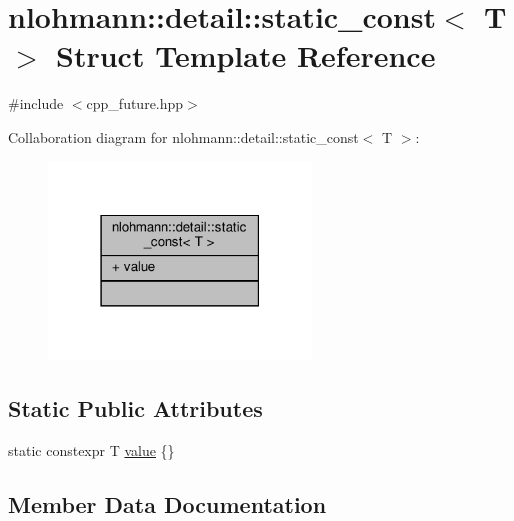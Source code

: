 \hypertarget{structnlohmann_1_1detail_1_1static__const}{}\section{nlohmann\+:\+:detail\+:\+:static\+\_\+const$<$ T $>$ Struct Template Reference}
\label{structnlohmann_1_1detail_1_1static__const}


{\ttfamily \#include $<$cpp\+\_\+future.\+hpp$>$}



Collaboration diagram for nlohmann\+:\+:detail\+:\+:static\+\_\+const$<$ T $>$\+:
\nopagebreak
\begin{figure}[H]
\begin{center}
\leavevmode
\includegraphics[width=198pt]{structnlohmann_1_1detail_1_1static__const__coll__graph}
\end{center}
\end{figure}
\subsection*{Static Public Attributes}
\begin{DoxyCompactItemize}
\item 
static constexpr T \hyperlink{structnlohmann_1_1detail_1_1static__const_a6bb7ab2ddd6abc41fb4ffb7c6dfa237e}{value} \{\}
\end{DoxyCompactItemize}


\subsection{Member Data Documentation}
\mbox{\label{structnlohmann_1_1detail_1_1static__const_a6bb7ab2ddd6abc41fb4ffb7c6dfa237e}} 
